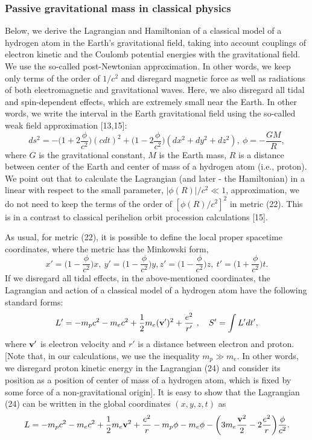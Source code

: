 \documentclass{ws-ijmpd}
\begin{document}
\subsubsection{Passive gravitational mass in classical physics}

Below, we derive the Lagrangian and Hamiltonian of a classical model
of a hydrogen atom in the Earth's gravitational field, taking into
account couplings of electron kinetic and the Coulomb potential
energies with the gravitational field. We use the so-called
post-Newtonian approximation. In other words, we keep only terms
of the order of $1/c^2$ and disregard magnetic force as well as
radiations of both electromagnetic and gravitational waves. Here,
we also disregard all tidal and spin-dependent effects, which are
extremely small near the Earth. In other words, we write the
interval in the Earth gravitational field using the so-called weak
field approximation [13,15]:
\begin{equation}
d s^2 = -\biggl(1 + 2 \frac{\phi}{c^2} \biggl)(cdt)^2 + \biggl(1 -
2 \frac{\phi}{c^2} \biggl) (dx^2 +dy^2+dz^2 ), \ \phi = -
\frac{GM}{R} ,
\end{equation}
where $G$ is the gravitational
constant, $M$ is the Earth mass, $R$ is a distance between center
of the Earth and center of mass of a hydrogen atom (i.e., proton).
We point out that to calculate the Lagrangian (and later - the
Hamiltonian) in a linear with respect to the small parameter,
$|\phi(R)| / c^2 \ll 1$, approximation, we do not need to keep the
terms of the order of $[\phi(R)/c^2]^2$ in metric (22). This is in
a contrast to classical perihelion orbit procession calculations
[15].

As usual, for metric (22), it is possible to define the local proper
spacetime coordinates, where the metric has the Minkowski form,
\begin{equation}
x'=\biggl(1-\frac{\phi}{c^2} \biggl) x, \ y'=
\biggl(1-\frac{\phi}{c^2} \biggl) y, z'=\biggl(1-\frac{\phi}{c^2}
\biggl) z , \ t'= \biggl(1+\frac{\phi}{c^2} \biggl) t.
\end{equation}
If we disregard all tidal effects, in the above-mentioned coordinates,
the Lagrangian and action of a classical model of a hydrogen atom have
the following standard forms:
\begin{equation}
L' = -m_p c^2 -m_e c^2 + \frac{1}{2} m_e ({\bf v'})^2 +
\frac{e^2}{r'} \ , \ \ \ S' = \int L' dt' ,
\end{equation}
where ${\bf v'}$ is electron velocity and $r'$ is a distance
between electron and proton. [Note that, in our calculations, we
use the inequality $m_p \gg m_e$. In other words, we disregard
proton kinetic energy in the Lagrangian (24) and consider its
position as a position of center of mass of a hydrogen atom, which
is fixed by some force of a non-gravitational origin]. It is easy
to show that the Lagrangian (24) can be written in the global
coordinates $(x,y,z,t)$ as
\begin{equation}
L = -m_p c^2 -m_e c^2 +  \frac{1}{2}m_e{\bf v}^2+\frac{e^2}{r} - m_p \phi - m_e \phi - \biggl( 3m_e\frac{{\bf v}^2}{2}-2\frac{e^2}{r} \biggl) \frac{\phi}{c^2} .
\end{equation}
\end{document}

